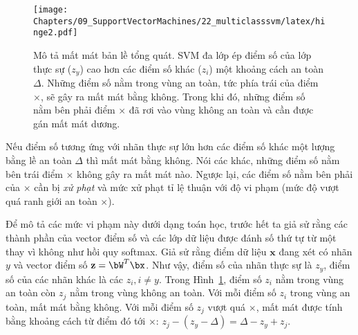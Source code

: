 \begin{figure}[t]
\centering
    \texttt{[image: Chapters/09\_SupportVectorMachines/22\_multiclasssvm/latex/hinge2.pdf]}
    \caption[]{Mô tả mất mát bản lề tổng quát. SVM đa lớp ép điểm số của lớp thực sự ($z_y$) cao hơn các điểm số khác
    ($z_i$) một khoảng cách an toàn $\Delta$. Những điểm số nằm trong vùng an toàn, tức phía trái của điểm $\times$, sẽ gây ra mất mát bằng không. Trong khi đó, những điểm số nằm bên phải điểm $\times$ đã rơi vào vùng không an toàn và cần được gán mất mát dương.}
    \label{fig:22_6}
\end{figure}

Nếu điểm số tương ứng với nhãn thực sự lớn hơn các điểm số khác một lượng bằng
lề an toàn $\Delta$ thì mất mát bằng không. Nói các khác, những điểm số nằm bên
trái điểm $\times$ không gây ra mất mát nào. Ngược lại, các điểm số nằm bên phải
của $\times$ cần bị \textit{xử phạt} và mức xử phạt tỉ lệ thuận với độ vi
phạm (mức độ vượt quá ranh giới an toàn $\times$).
 
Để mô tả các mức vi phạm này dưới dạng toán học, trước hết ta giả sử rằng các
thành phần của vector điểm số và các lớp dữ liệu được đánh số thứ tự từ một thay
vì không như hồi quy softmax. Giả sử rằng điểm dữ liệu $\mathbf{x}$ đang xét có
nhãn $y$ và vector điểm số $\mathbf{z} = \bW^T\bx$. Như vậy, điểm số của nhãn
thực sự là $z_y$, điểm số của các nhãn khác là các $z_i, i \neq y$. Trong
Hình~\ref{fig:22_6}, điểm số $z_i$ nằm trong vùng an toàn còn $z_j$ nằm trong
vùng không an toàn. Với mỗi điểm số $z_i$ trong vùng an toàn, mất mát bằng
không. Với mỗi điểm số $z_j$ vượt quá $\times$, mất mát được tính bằng khoảng
cách từ điểm đó tới $\times$: $z_j - (z_y - \Delta) =
    \Delta - z_y + z_j$.


     
